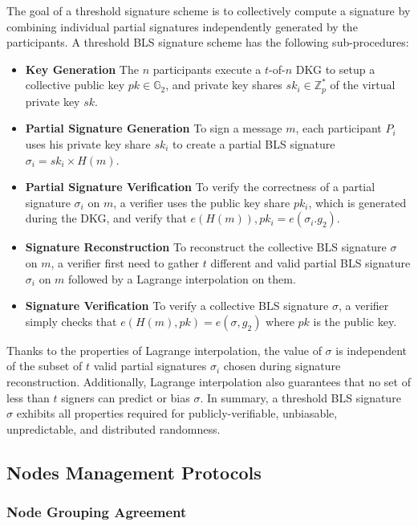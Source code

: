 \documentclass[11pt]{article}
\begin{document}
The goal of a threshold signature scheme is to collectively compute a signature by combining individual partial signatures independently generated by the participants. A threshold BLS signature scheme has the following sub-procedures:

\begin{itemize}
    \item[] \textbf{Key Generation} The $n$ participants execute a $t$-of-$n$ DKG to setup a collective public key $pk \in \mathbb{G}_2$, and private key shares $sk_i \in \mathbb{Z}_p^*$ of the virtual private key $sk$.
    \item[] \textbf{Partial Signature Generation} To sign a message $m$, each participant $P_i$  uses his private key share $sk_i$  to create a partial BLS signature $\sigma_i=sk_i \times H(m)$.
    \item[] \textbf{Partial Signature Verification} To verify the correctness of a partial signature $\sigma_i$ on $m$, a verifier uses the public key share $pk_i$, which is generated during the DKG, and verify that $e(H(m)),pk_i=e(\sigma_i.g_2)$.
    \item[] \textbf{Signature Reconstruction} To reconstruct the collective BLS signature $\sigma$ on $m$, a verifier first need to gather $t$ different and valid partial BLS signature $\sigma_i$ on $m$ followed by a Lagrange interpolation on them.
    \item[] \textbf{Signature Verification} To verify a collective BLS signature $\sigma$, a verifier simply checks that $e(H(m),pk)=e(\sigma,g_2)$ where $pk$ is the public key.
\end{itemize}

Thanks to the properties of Lagrange interpolation, the value of $\sigma$ is independent of the subset of $t$ valid partial signatures $\sigma_i$ chosen during signature reconstruction. Additionally, Lagrange interpolation also guarantees that no set of less than $t$ signers can predict or bias $\sigma$. In summary, a threshold BLS signature $\sigma$  exhibits all properties required for publicly-verifiable, unbiasable, unpredictable, and distributed randomness.

\subsection{Nodes Management Protocols}

\subsubsection{Node Grouping Agreement}
\end{document}
